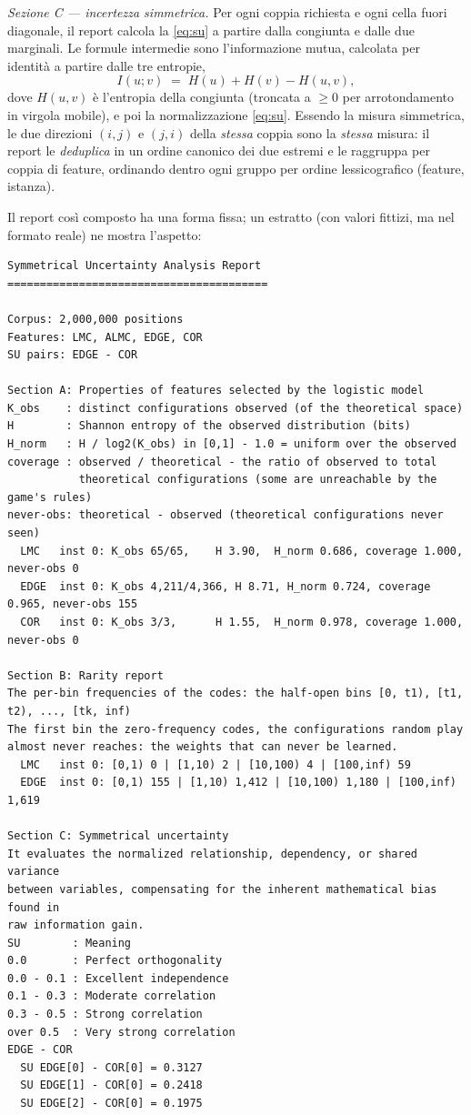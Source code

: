 \emph{Sezione C — incertezza simmetrica.} Per ogni coppia richiesta e ogni
cella fuori diagonale, il report calcola la \eqref{eq:su} a partire dalla
congiunta e dalle due marginali. Le formule intermedie sono
l'informazione mutua, calcolata per identità a partire dalle tre entropie,
\begin{equation}
  I(u;v) \;=\; H(u) + H(v) - H(u,v),
  \label{eq:mutual-info}
\end{equation}
dove $H(u,v)$ è l'entropia della congiunta (troncata a $\ge 0$ per
arrotondamento in virgola mobile), e poi la normalizzazione
\eqref{eq:su}. Essendo la misura simmetrica, le due direzioni $(i,j)$ e
$(j,i)$ della \emph{stessa} coppia sono la \emph{stessa} misura: il report le
\emph{deduplica} in un ordine canonico dei due estremi e le raggruppa per
coppia di feature, ordinando dentro ogni gruppo per ordine lessicografico
(feature, istanza).

Il report così composto ha una forma fissa; un estratto (con valori fittizi,
ma nel formato reale) ne mostra l'aspetto:

\begin{lstlisting}[caption={Estratto illustrativo del report \texttt{su\_analysis} (formato reale, valori fittizi).}]
Symmetrical Uncertainty Analysis Report
========================================

Corpus: 2,000,000 positions
Features: LMC, ALMC, EDGE, COR
SU pairs: EDGE - COR

Section A: Properties of features selected by the logistic model
K_obs    : distinct configurations observed (of the theoretical space)
H        : Shannon entropy of the observed distribution (bits)
H_norm   : H / log2(K_obs) in [0,1] - 1.0 = uniform over the observed
coverage : observed / theoretical - the ratio of observed to total
           theoretical configurations (some are unreachable by the game's rules)
never-obs: theoretical - observed (theoretical configurations never seen)
  LMC   inst 0: K_obs 65/65,    H 3.90,  H_norm 0.686, coverage 1.000, never-obs 0
  EDGE  inst 0: K_obs 4,211/4,366, H 8.71, H_norm 0.724, coverage 0.965, never-obs 155
  COR   inst 0: K_obs 3/3,      H 1.55,  H_norm 0.978, coverage 1.000, never-obs 0

Section B: Rarity report
The per-bin frequencies of the codes: the half-open bins [0, t1), [t1, t2), ..., [tk, inf)
The first bin the zero-frequency codes, the configurations random play
almost never reaches: the weights that can never be learned.
  LMC   inst 0: [0,1) 0 | [1,10) 2 | [10,100) 4 | [100,inf) 59
  EDGE  inst 0: [0,1) 155 | [1,10) 1,412 | [10,100) 1,180 | [100,inf) 1,619

Section C: Symmetrical uncertainty
It evaluates the normalized relationship, dependency, or shared variance
between variables, compensating for the inherent mathematical bias found in
raw information gain.
SU        : Meaning
0.0       : Perfect orthogonality
0.0 - 0.1 : Excellent independence
0.1 - 0.3 : Moderate correlation
0.3 - 0.5 : Strong correlation
over 0.5  : Very strong correlation
EDGE - COR
  SU EDGE[0] - COR[0] = 0.3127
  SU EDGE[1] - COR[0] = 0.2418
  SU EDGE[2] - COR[0] = 0.1975
\end{lstlisting}

